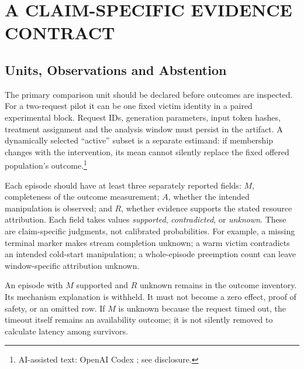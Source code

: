\documentclass[a4paper,twoside]{article}
\newcommand{\aicite}{\footnote{AI-assisted text: OpenAI Codex \cite{codex}; see disclosure.}}
\begin{document}
\section{\uppercase{A Claim-Specific Evidence Contract}}

\subsection{Units, Observations and Abstention}

The primary comparison unit should be declared before outcomes are inspected. For a two-request pilot it can be one fixed victim identity in a paired experimental block. Request IDs, generation parameters, input token hashes, treatment assignment and the analysis window must persist in the artifact. A dynamically selected ``active'' subset is a separate estimand: if membership changes with the intervention, its mean cannot silently replace the fixed offered population's outcome.\aicite

Each episode should have at least three separately reported fields: $M$, completeness of the outcome measurement; $A$, whether the intended manipulation is observed; and $R$, whether evidence supports the stated resource attribution. Each field takes values \emph{supported}, \emph{contradicted}, or \emph{unknown}. These are claim-specific judgments, not calibrated probabilities. For example, a missing terminal marker makes stream completion unknown; a warm victim contradicts an intended cold-start manipulation; a whole-episode preemption count can leave window-specific attribution unknown.

An episode with $M$ supported and $R$ unknown remains in the outcome inventory. Its mechanism explanation is withheld. It must not become a zero effect, proof of safety, or an omitted row. If $M$ is unknown because the request timed out, the timeout itself remains an availability outcome; it is not silently removed to calculate latency among survivors.
\end{document}

